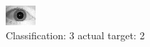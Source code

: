 \begin{figure}[h!]
\begin{center}
\includegraphics[width=0.60\columnwidth]{figures/ID1792_class_3_target_2.png}
\end{center}
\caption{ Classification: 3 actual target: 2}
\label{fig:ID1792_class_3_target_2}
\end{figure}
